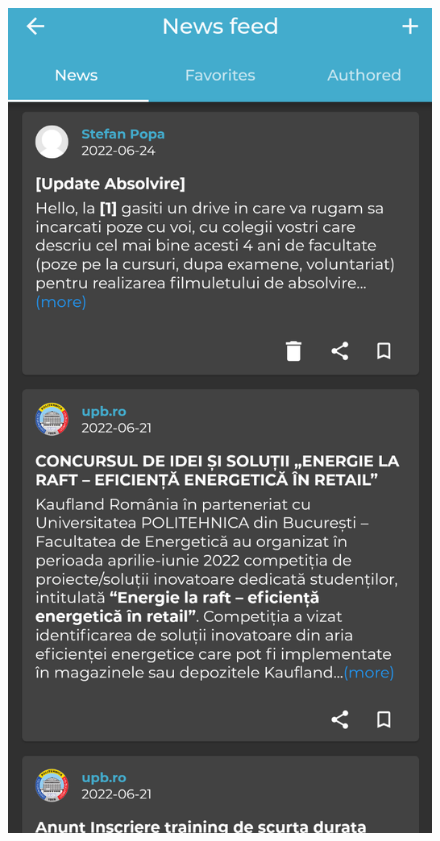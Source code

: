 \begin{figure}[!ht]
\begin{minipage}[b]{0.32\textwidth}
        \label{4:fig:news-feed-home-page}
    \end{minipage}
    \hfill
    \begin{minipage}[b]{0.32\textwidth}
        \captionsetup{justification=centering}
        \includegraphics[width=\textwidth]{figures/app/final/news-feed-2-final.png}

\end{minipage}
\end{figure}
